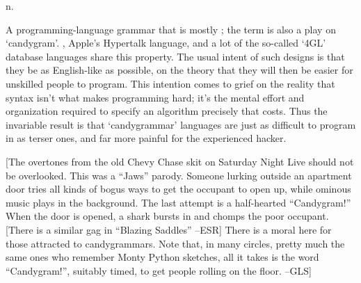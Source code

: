  n.

A programming-language grammar that is mostly ; the
term is also a play on `candygram'. , Apple's Hypertalk
language, and a lot of the so-called `4GL' database languages share this
property. The usual intent of such designs is that they be as English-like as
possible, on the theory that they will then be easier for unskilled people to
program. This intention comes to grief on the reality that syntax isn't what
makes programming hard; it's the mental effort and organization required to
specify an algorithm precisely that costs. Thus the invariable result is that
`candygrammar' languages are just as difficult to program in as terser ones, and
far more painful for the experienced hacker.

[The overtones from the old Chevy Chase skit on Saturday Night Live should not
be overlooked. This was a ``Jaws'' parody. Someone lurking outside an apartment
door tries all kinds of bogus ways to get the occupant to open up, while ominous
music plays in the background. The last attempt is a half-hearted ``Candygram!''
When the door is opened, a shark bursts in and chomps the poor occupant. [There
is a similar gag in ``Blazing Saddles'' --ESR] There is a moral here for those
attracted to candygrammars. Note that, in many circles, pretty much the same
ones who remember Monty Python sketches, all it takes is the word
``Candygram!'', suitably timed, to get people rolling on the floor.
--GLS]

